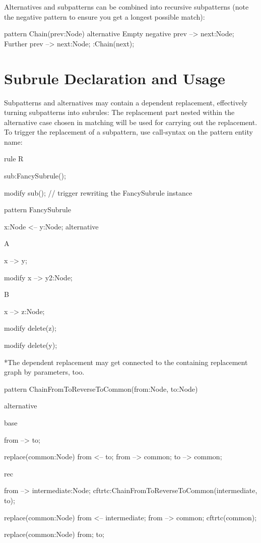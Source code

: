Alternatives and subpatterns can be combined into recursive subpatterns
(note the negative pattern to ensure you get a longest possible match):

\begin{example}
  \begin{grgen}
pattern Chain(prev:Node) {
  alternative {
    Empty {
      negative {
        prev --> next:Node;
      }
    }
    Further {
      prev --> next:Node;
      :Chain(next);
    }
  }
}
  \end{grgen}
\end{example}


\section{Subrule Declaration and Usage}
\label{nac}

Subpatterns and alternatives may contain a dependent replacement, effectively
turning subpatterns into subrules:
The replacement part nested within the alternative case chosen in matching
will be used for carrying out the replacement. To trigger the replacement of a
subpattern, use call-syntax on the pattern entity name:

\begin{example}
  \begin{grgen}
rule R {
  sub:FancySubrule();

  modify {
    sub();        // trigger rewriting the FancySubrule instance
  }
}

pattern FancySubrule {
  x:Node <-- y:Node;
  alternative {
    A {
      x --> y;

      modify {
        x --> y2:Node;
      }
    }
    B {
      x --> z:Node;

      modify {
        delete(z);
      }
    }
  }

  modify {
    delete(y);
  }
}
  \end{grgen}
\end{example}

*The dependent replacement may get connected to the containing replacement
graph by parameters, too.

\begin{example}
  \begin{grgen}
pattern ChainFromToReverseToCommon(from:Node, to:Node) {
  alternative {
    base {
      from --> to;

      replace(common:Node) {
        from <-- to;
        from --> common;
        to --> common;
      }
    }
    rec {
      from --> intermediate:Node;
      cftrtc:ChainFromToReverseToCommon(intermediate, to);

      replace(common:Node) {
        from <-- intermediate;
        from --> common;
        cftrtc(common);
      }
    }
  }

  replace(common:Node) {
    from; to;
  }
}
  \end{grgen}
\end{example}

